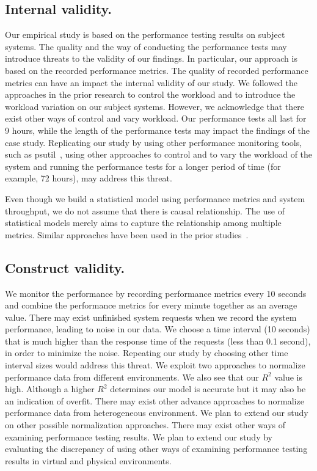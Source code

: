 \documentclass[smallextended]{svjour3}       %
\begin{document}
\subsection{Internal validity.}

Our empirical study is based on the performance testing results on subject systems. The quality and the way of conducting the performance tests may introduce threats to the validity of our findings. In particular, our approach is based on the recorded performance metrics. The quality of recorded performance metrics can have an impact the internal validity of our study. We followed the approaches in the prior research to control the workload and to introduce the workload variation on our subject systems. However, we acknowledge that there exist other ways of control and vary workload. Our performance tests all last for 9 hours, while the length of the performance tests may impact the findings of the case study. Replicating our study by using other performance monitoring tools, such as psutil~\cite{psutil}, using other approaches to control and to vary the workload of the system and running the performance tests for a longer period of time (for example, 72 hours), may address this threat.

Even though we build a statistical model using performance metrics and system throughput, we do not assume that there is causal relationship. The use of statistical models merely aims to capture the relationship among multiple metrics. Similar approaches have been used in the prior studies~\cite{Cohen:2005:CIC:1095810.1095821, Shang:2015:ADP:2668930.2688052, xiong2013vperfguard}. 



\subsection{Construct validity.}
We monitor the performance by recording performance metrics every 10 seconds and combine the performance metrics for every minute together as an average value. There may exist unfinished system requests when we record the system performance, leading to noise in our data. We choose a time interval (10 seconds) that is much higher than the response time of the requests (less than 0.1 second), in order to minimize the noise. Repeating our study by choosing other time interval sizes would address this threat. We exploit two approaches to normalize performance data from different environments. We also see that our {$R^2$} value is high. Although a higher {$R^2$} determines our model is accurate but it may also be an indication of overfit. There may exist other advance approaches to normalize performance data from heterogeneous environment. We plan to extend our study on other possible normalization approaches. There may exist other ways of examining performance testing results. We plan to extend our study by evaluating the discrepancy of using other ways of examining performance testing results in virtual and physical environments.
\end{document}
